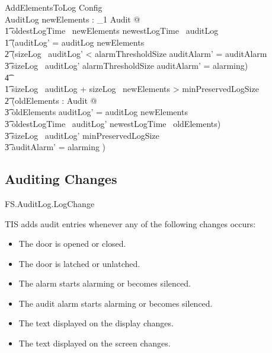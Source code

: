 \begin{schema}{AddElementsToLog}
        Config
\\      \Delta AuditLog
\where
        \exists newElements : \finset_1 Audit @
\\ \t1        oldestLogTime~ newElements \geq newestLogTime~ auditLog
\also
\\ \t1 \land  (auditLog' = auditLog \cup newElements
\\ \t2  \land (sizeLog~ auditLog' < alarmThresholdSize \land
auditAlarm' = auditAlarm   
\\ \t3  \lor  sizeLog~ auditLog' \geq alarmThresholdSize \land
auditAlarm' = alarming)
\\ \t4  \lor
\\ \t1    sizeLog~ auditLog + sizeLog~ newElements > minPreservedLogSize 
\\ \t2  \land (\exists oldElements : \finset Audit  @ 
\\ \t3  oldElements \cup auditLog' = auditLog \cup newElements 
\\ \t3  \land oldestLogTime~ auditLog' \geq newestLogTime~ oldElements)
\\ \t3  \land sizeLog~ auditLog' \geq minPreservedLogSize
\\ \t3  \land auditAlarm' = alarming  )            
\end{schema} %

\subsection{Auditing Changes}

\begin{traceunit}{FS.AuditLog.LogChange}
\end{traceunit}


TIS adds audit entries whenever any of the following changes occurs:
\begin{itemize}
\item
The door is opened or closed.
\item
The door is latched or unlatched.
\item
The alarm  starts alarming or becomes silenced.
\item
The audit alarm  starts alarming or becomes silenced.
\item
The text displayed on the display changes.
\item
The text displayed on the screen changes.
\end{itemize}

